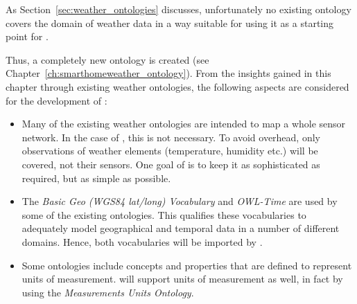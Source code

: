 As Section~\ref{sec:weather_ontologies} discusses, unfortunately no existing ontology covers the domain of weather data in a way suitable for using it as a starting point for \smarthomeweather.

Thus, a completely new ontology is created (see Chapter~\ref{ch:smarthomeweather_ontology}). From the insights gained in this chapter through existing weather ontologies, the following aspects are considered for the development of \smarthomeweather:

\begin{itemize}
  \item Many of the existing weather ontologies are intended to map a whole sensor network. In the case of \smarthomeweather, this is not necessary. To avoid overhead, only observations of weather elements (temperature, humidity etc.) will be covered, not their sensors. One goal of \smarthomeweather is to keep it as sophisticated as required, but as simple as possible.
  
  \item The \emph{Basic Geo (WGS84 lat/long) Vocabulary} and \emph{OWL-Time} are used by some of the existing ontologies. This qualifies these vocabularies to adequately model geographical and temporal data in a number of different domains. Hence, both vocabularies will be imported by \smarthomeweather.
  
  \item Some ontologies include concepts and properties that are defined to represent units of measurement. \smarthomeweather will support units of measurement as well, in fact by using the \emph{Measurements Units Ontology}.
\end{itemize}

